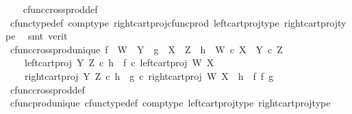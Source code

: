 \begin{isabellebody}
%
\isadelimproof
\ \ %
\endisadelimproof
%
\isatagproof
{}\isamarkupfalse%
\ cfunc{\isacharunderscore}{\kern0pt}cross{\isacharunderscore}{\kern0pt}prod{\isacharunderscore}{\kern0pt}def\isanewline
\ \ \isamarkupfalse%
\ cfunc{\isacharunderscore}{\kern0pt}type{\isacharunderscore}{\kern0pt}def\ comp{\isacharunderscore}{\kern0pt}type\ right{\isacharunderscore}{\kern0pt}cart{\isacharunderscore}{\kern0pt}proj{\isacharunderscore}{\kern0pt}cfunc{\isacharunderscore}{\kern0pt}prod\ left{\isacharunderscore}{\kern0pt}cart{\isacharunderscore}{\kern0pt}proj{\isacharunderscore}{\kern0pt}type\ right{\isacharunderscore}{\kern0pt}cart{\isacharunderscore}{\kern0pt}proj{\isacharunderscore}{\kern0pt}type\ \isamarkupfalse%
\ {\isacharparenleft}{\kern0pt}smt\ {\isacharparenleft}{\kern0pt}verit{\isacharparenright}{\kern0pt}{\isacharparenright}{\kern0pt}%
\endisatagproof
{\isafoldproof}%
%
\isadelimproof
\isanewline
%
\endisadelimproof
\isanewline
{}\isamarkupfalse%
\ cfunc{\isacharunderscore}{\kern0pt}cross{\isacharunderscore}{\kern0pt}prod{\isacharunderscore}{\kern0pt}unique{\isacharcolon}{\kern0pt}\ {\isachardoublequoteopen}f\ {\isacharcolon}{\kern0pt}\ W\ {\isasymrightarrow}\ Y\ {\isasymLongrightarrow}\ g\ {\isacharcolon}{\kern0pt}\ X\ {\isasymrightarrow}\ Z\ {\isasymLongrightarrow}\ h\ {\isacharcolon}{\kern0pt}\ W\ {\isasymtimes}\isactrlsub c\ X\ {\isasymrightarrow}\ Y\ {\isasymtimes}\isactrlsub c\ Z\ {\isasymLongrightarrow}\isanewline
\ \ \ \ left{\isacharunderscore}{\kern0pt}cart{\isacharunderscore}{\kern0pt}proj\ Y\ Z\ {\isasymcirc}\isactrlsub c\ h\ {\isacharequal}{\kern0pt}\ f\ {\isasymcirc}\isactrlsub c\ left{\isacharunderscore}{\kern0pt}cart{\isacharunderscore}{\kern0pt}proj\ W\ X\ {\isasymLongrightarrow}\isanewline
\ \ \ \ right{\isacharunderscore}{\kern0pt}cart{\isacharunderscore}{\kern0pt}proj\ Y\ Z\ {\isasymcirc}\isactrlsub c\ h\ {\isacharequal}{\kern0pt}\ g\ {\isasymcirc}\isactrlsub c\ right{\isacharunderscore}{\kern0pt}cart{\isacharunderscore}{\kern0pt}proj\ W\ X\ {\isasymLongrightarrow}\ h\ {\isacharequal}{\kern0pt}\ f\ {\isasymtimes}\isactrlsub f\ g{\isachardoublequoteclose}\isanewline
%
\isadelimproof
\ \ %
\endisadelimproof
%
\isatagproof
{}\isamarkupfalse%
\ cfunc{\isacharunderscore}{\kern0pt}cross{\isacharunderscore}{\kern0pt}prod{\isacharunderscore}{\kern0pt}def\isanewline
\ \ \isamarkupfalse%
\ cfunc{\isacharunderscore}{\kern0pt}prod{\isacharunderscore}{\kern0pt}unique\ cfunc{\isacharunderscore}{\kern0pt}type{\isacharunderscore}{\kern0pt}def\ comp{\isacharunderscore}{\kern0pt}type\ left{\isacharunderscore}{\kern0pt}cart{\isacharunderscore}{\kern0pt}proj{\isacharunderscore}{\kern0pt}type\ right{\isacharunderscore}{\kern0pt}cart{\isacharunderscore}{\kern0pt}proj{\isacharunderscore}{\kern0pt}type\ \isamarkupfalse%

\end{isabellebody}
